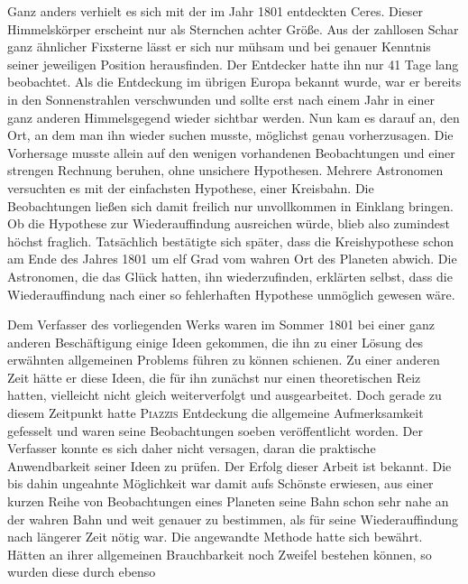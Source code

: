 Ganz anders verhielt es sich mit der im Jahr 1801 entdeckten Ceres. Dieser Himmelskörper erscheint nur als Sternchen achter Größe. Aus der zahllosen Schar ganz ähnlicher Fixsterne lässt er sich nur mühsam und bei genauer Kenntnis seiner jeweiligen Position herausfinden. Der Entdecker hatte ihn nur 41 Tage lang beobachtet. Als die Entdeckung im übrigen Europa bekannt wurde, war er bereits in den Sonnenstrahlen verschwunden und sollte erst nach einem Jahr in einer ganz anderen Himmelsgegend wieder sichtbar werden. Nun kam es darauf an, den Ort, an dem man ihn wieder suchen musste, möglichst genau vorherzusagen. Die Vorhersage musste allein auf den wenigen vorhandenen Beobachtungen und einer strengen Rechnung beruhen, ohne unsichere Hypothesen. Mehrere Astronomen versuchten es mit der einfachsten Hypothese, einer Kreisbahn. Die Beobachtungen ließen sich damit freilich nur unvollkommen in Einklang bringen. Ob die Hypothese zur Wiederauffindung ausreichen würde, blieb also zumindest höchst fraglich. Tatsächlich bestätigte sich später, dass die Kreishypothese schon am Ende des Jahres 1801 um elf Grad vom wahren Ort des Planeten abwich. Die Astronomen, die das Glück hatten, ihn wiederzufinden, erklärten selbst, dass die Wiederauffindung nach einer so fehlerhaften Hypothese unmöglich gewesen wäre.

Dem Verfasser des vorliegenden Werks waren im Sommer 1801 bei einer ganz anderen Beschäftigung einige Ideen gekommen, die ihn zu einer Lösung des erwähnten allgemeinen Problems führen zu können schienen. Zu einer anderen Zeit hätte er diese Ideen, die für ihn zunächst nur einen theoretischen Reiz hatten, vielleicht nicht gleich weiterverfolgt und ausgearbeitet. Doch gerade zu diesem Zeitpunkt hatte \textsc{Piazzis} Entdeckung die allgemeine Aufmerksamkeit gefesselt und waren seine Beobachtungen soeben veröffentlicht worden. Der Verfasser konnte es sich daher nicht versagen, daran die praktische Anwendbarkeit seiner Ideen zu prüfen. Der Erfolg dieser Arbeit ist bekannt. Die bis dahin ungeahnte Möglichkeit war damit aufs Schönste erwiesen, aus einer kurzen Reihe von Beobachtungen eines Planeten seine Bahn schon sehr nahe an der wahren Bahn und weit genauer zu bestimmen, als für seine Wiederauffindung nach längerer Zeit nötig war. Die angewandte Methode hatte sich bewährt. Hätten an ihrer allgemeinen Brauchbarkeit noch Zweifel bestehen können, so wurden diese durch ebenso
